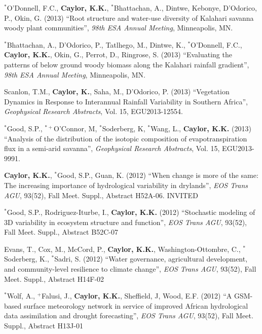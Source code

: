 \documentclass[10pt]{article}
\begin{document}
\begin{etaremune}
\item $^{*}$O'Donnell, F.C., \textbf{Caylor, K.K.}, $^{*}$Bhattachan, A., Dintwe, Kebonye, D'Odorico, P., Okin, G. (2013) ``Root structure and water-use diversity of Kalahari savanna woody plant communities'', \emph{98th ESA Annual Meeting}, Minneapolis, MN.

\item $^{*}$Bhattachan, A., D'Odorico, P., Tatlhego, M., Dintwe, K., $^{*}$O'Donnell, F.C., \textbf{Caylor, K.K.}, Okin, G., Perrot, D., Ringrose, S. (2013) ``Evaluating the patterns of below ground woody biomass along the Kalahari rainfall gradient'', \emph{98th ESA Annual Meeting}, Minneapolis, MN.

\item Scanlon, T.M., \textbf{Caylor, K.}, Saha, M., D'Odorico, P. (2013) ``Vegetation Dynamics in Response to Interannual Rainfall Variability in Southern Africa'', \emph{Geophysical Research Abstracts}, Vol. 15, EGU2013-12554.

\item $^{*}$Good, S.P., $^{*+}$O'Connor, M, $^{*}$Soderberg, K, $^{*}$Wang, L., \textbf{Caylor, K.K.} (2013) ``Analysis of the distribution of the isotopic composition of evapotranspiration flux in a semi-arid savanna'', \emph{Geophysical Research Abstracts}, Vol. 15, EGU2013-9991.

\item \textbf{Caylor, K.K.}, $^{*}$Good, S.P., Guan, K. (2012) ``When change is more of the same: The increasing importance of hydrological variability in drylands'', \emph{EOS Trans AGU}, 93(52), Fall Meet. Suppl., Abstract H52A-06. INVITED

\item $^{*}$Good, S.P., Rodriguez-Iturbe, I., \textbf{Caylor, K.K.} (2012) ``Stochastic modeling of 3D variability in ecosystem structure and function'', \emph{EOS Trans AGU}, 93(52), Fall Meet. Suppl., Abstract B52C-07

\item Evans, T., Cox, M., McCord, P., \textbf{Caylor, K.K.}, Washington-Ottombre, C., $^{*}$Soderberg, K., $^{*}$Sadri, S. (2012) ``Water governance, agricultural development, and community-level resilience to climate change'', \emph{EOS Trans AGU}, 93(52), Fall Meet. Suppl., Abstract H14F-02

\item $^{*}$Wolf, A., $^{+}$Falusi, J., \textbf{Caylor, K.K.}, Sheffield, J, Wood, E.F. (2012) ``A GSM-based surface meteorology network in service of improved African hydrological data assimilation and drought forecasting'', \emph{EOS Trans AGU}, 93(52), Fall Meet. Suppl., Abstract H13J-01


\end{etaremune}
\end{document}
